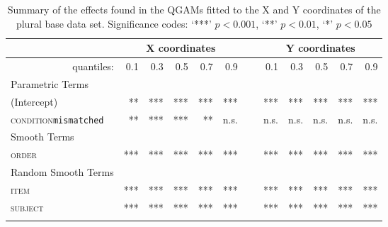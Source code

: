 \begin{table}\fontsize{9}{10}
\caption{Summary of the effects found in the QGAMs fitted to the X and Y coordinates of the plural base data set. Significance codes: `***' $p < 0.001$, `**' $p < 0.01$, `*' $p < 0.05$}
\label{tab:7.12}
\centering
\begin{tabular}{lrrrrrrrrrrr}
\lsptoprule
~                   & \multicolumn{5}{c}{X coordinates}       & \multicolumn{1}{c}{}                        & \multicolumn{5}{c}{Y coordinates}                               \\
\midrule
\multicolumn{1}{r}{quantiles:}          & 0.1        & 0.3        & 0.5        & 0.7        & 0.9  & ~       & 0.1        & 0.3        & 0.5        & 0.7        & 0.9         \\
\midrule
Parametric Terms    & \textbf{~} & \textbf{~} & \textbf{~} & \textbf{~} & \textbf{~} & \textbf{~} & \textbf{~} & \textbf{~} & \textbf{~} & \textbf{~}  \\
\midrule
(Intercept)         & **        & ***        & ***        & ***        & *** & ~       & ***        & ***        & ***        & ***        & ***          \\
\textsc{condition}\texttt{mismatched} & **       & ***          & ***        & **        & n.s.  & ~      & n.s.       & n.s.        & n.s.        & n.s.        & n.s.         \\
\midrule
Smooth Terms        & \textbf{~} & \textbf{~} & \textbf{~} & \textbf{~} & \textbf{~} & \textbf{~} & \textbf{~} & \textbf{~} & \textbf{~} & \textbf{~}  \\
\midrule
\textsc{order}               & ***        & ***        & ***        & ***        & *** & ~       & ***        & ***        & ***        & ***        & ***         \\
\midrule
Random Smooth Terms & \textbf{~} & \textbf{~} & \textbf{~} & \textbf{~} & \textbf{~} & \textbf{~} & \textbf{~} & \textbf{~} & \textbf{~} & \textbf{~}  \\
\midrule
\textsc{item}                & ***        & ***        & ***        & ***        & ***  & ~      & ***        & ***        & ***        & ***        & ***         \\
\textsc{subject}             & ***        & ***        & ***        & ***        & ***  & ~      & ***        & ***        & ***        & ***        & ***        \\
\lspbottomrule
\end{tabular}
\end{table}

